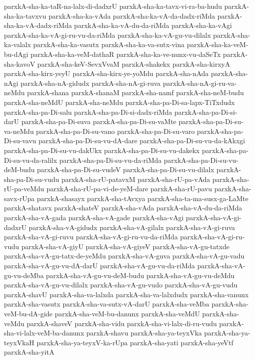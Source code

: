 {parxkA-sha-ka-taR-na-lalx-di-dadxrU
parxkA-sha-ka-tavx-vi-ra-ba-hudu
parxkA-sha-ka-tavxvu
parxkA-sha-ka-vAda
parxkA-sha-ka-vA-da-dadx-riMda
parxkA-sha-ka-vA-dadx-riMda
parxkA-sha-ka-vA-du-da-riMda
parxkA-sha-ka-vAgi
parxkA-sha-ka-vA-gi-ru-vu-da-riMda
parxkA-sha-ka-vA-gu-vu-dilalx
parxkA-sha-ka-valalx
parxkA-sha-ka-vasutx
parxkA-sha-ka-va-sutx-vina
parxkA-sha-ka-veM-bu-dAgi
parxkA-sha-ka-veM-dathaR
parxkA-sha-ka-ve-nunx-vu-daSeTx
parxkA-sha-kavoV
parxkA-sha-keV-SevxVvaM
parxkA-shakekx
parxkA-sha-kirxyA
parxkA-sha-kirx-yeyU
parxkA-sha-kirx-ye-yoMdu
parxkA-sha-nAda
parxkA-sha-nAgi
parxkA-sha-nA-gidudx
parxkA-sha-nA-gi-ruva
parxkA-sha-nA-gi-ru-va-neMdu
parxkA-shana
parxkA-shanaM
parxkA-sha-namf
parxkA-sha-neM-budu
parxkA-sha-neMdU
parxkA-sha-neMdu
parxkA-sha-pa-Di-sa-lapx-TiTxdudx
parxkA-sha-pa-Di-salu
parxkA-sha-pa-Di-si-dadx-riMda
parxkA-sha-pa-Di-si-darU
parxkA-sha-pa-Di-suva
parxkA-sha-pa-Di-su-vaMte
parxkA-sha-pa-Di-su-va-neMdu
parxkA-sha-pa-Di-su-vano
parxkA-sha-pa-Di-su-varo
parxkA-sha-pa-Di-su-vavu
parxkA-sha-pa-Di-su-vu-dA-dare
parxkA-sha-pa-Di-su-vu-da-kAkxgi
parxkA-sha-pa-Di-su-vu-dakUkx
parxkA-sha-pa-Di-su-vu-dakekx
parxkA-sha-pa-Di-su-vu-da-ralilx
parxkA-sha-pa-Di-su-vu-da-riMda
parxkA-sha-pa-Di-su-vu-deM-budu
parxkA-sha-pa-Di-su-vudeV
parxkA-sha-pa-Di-su-vu-dilalx
parxkA-sha-pa-Di-su-vudu
parxkA-sha-rU-patavxM
parxkA-sha-rU-pa-vAda
parxkA-sha-rU-pa-veMdu
parxkA-sha-rU-pa-vi-de-yeM-dare
parxkA-sha-rU-pavu
parxkA-sha-savx-rUpa
parxkA-shasayx
parxkA-sha-tAvxya
parxkA-sha-ta-ma-susx-ga-LaMte
parxkA-shatavx
parxkA-shateV
parxkA-sha-vAda
parxkA-sha-vA-du-da-riMda
parxkA-sha-vA-gada
parxkA-sha-vA-gade
parxkA-sha-vAgi
parxkA-sha-vA-gi-dadxrU
parxkA-sha-vA-gidudx
parxkA-sha-vA-gilalx
parxkA-sha-vA-gi-ruva
parxkA-sha-vA-gi-ruvu
parxkA-sha-vA-gi-ru-vu-da-riMda
parxkA-sha-vA-gi-ru-vudu
parxkA-sha-vA-giyU
parxkA-sha-vA-giyeV
parxkA-sha-vA-gu-tatxde
parxkA-sha-vA-gu-tatx-de-yeMdu
parxkA-sha-vA-guva
parxkA-sha-vA-gu-vadu
parxkA-sha-vA-gu-vu-dA-darU
parxkA-sha-vA-gu-vu-da-riMda
parxkA-sha-vA-gu-vu-deMba
parxkA-sha-vA-gu-vu-deM-budu
parxkA-sha-vA-gu-vu-deMdu
parxkA-sha-vA-gu-vu-dilalx
parxkA-sha-vA-gu-vudo
parxkA-sha-vA-gu-vudu
parxkA-shavU
parxkA-sha-va-lalxda
parxkA-sha-va-lalxdudx
parxkA-sha-vanunx
parxkA-sha-vasutx
parxkA-sha-va-sutx-vA-darU
parxkA-sha-veMba
parxkA-sha-veM-bu-dA-gide
parxkA-sha-veM-bu-danunx
parxkA-sha-veMdU
parxkA-sha-veMdu
parxkA-shaveV
parxkA-sha-vidu
parxkA-sha-vi-lalx-di-ru-vudu
parxkA-sha-vi-lalx-veM-ba-danunx
parxkA-shavu
parxkA-sha-ya-teyxVka
parxkA-sha-ya-teyxVkaH
parxkA-sha-ya-teyxV-ka-rUpa
parxkA-sha-yati
parxkA-sha-yeVtf
parxkA-sha-yitA
}
